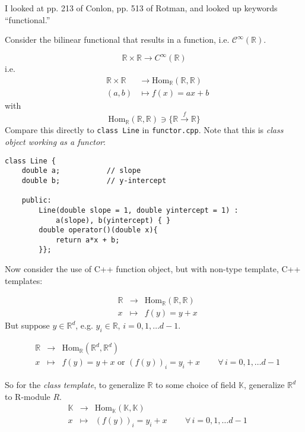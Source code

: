 \documentclass[10pt]{amsart}
\begin{document}
\begin{multicols*}{2}
I looked at pp. 213 of Conlon, pp. 513 of Rotman, and looked up keywords ``functional.''

Consider the bilinear functional that results in a function, i.e. $\mathcal{C}^{\infty}(\mathbb{R})$.

\[
\mathbb{R} \times \mathbb{R} \to C^{\infty}(\mathbb{R})
\]
i.e.
\begin{equation}
\begin{aligned}
  & \mathbb{R} \times \mathbb{R} & \to \text{Hom}_{\mathbb{R}}(\mathbb{R}, \mathbb{R})   \\
  & (a,b) & \mapsto f(x) = ax + b
\end{aligned}
\end{equation}
with
\[
\text{Hom}_{\mathbb{R}}(\mathbb{R}, \mathbb{R}) \ni \lbrace \mathbb{R} \xrightarrow{f} \mathbb{R} \rbrace
\]
Compare this directly to \verb|class Line| in \verb|functor.cpp|.  Note that this is \emph{class object working as a functor}:

\begin{lstlisting}
class Line {
	double a;			// slope
	double b; 			// y-intercept
	
	public:
		Line(double slope = 1, double yintercept = 1) : 
			a(slope), b(yintercept) { } 
		double operator()(double x){
			return a*x + b;
		}};
  \end{lstlisting}
Now consider the use of C++ function object, but with non-type template, C++ templates:

\begin{equation}
\begin{aligned}
  & \mathbb{R} & \to & \text{Hom}_{\mathbb{R}}( \mathbb{R}, \mathbb{R} ) \\ 
  & x & \mapsto & f(y) = y + x 
  \end{aligned}
  \end{equation}
But suppose $y\in \mathbb{R}^d$, e.g. $y_i \in \mathbb{R}$, $i=0,1,\dots d-1$.

\begin{equation}
\begin{aligned}
  & \mathbb{R} & \to & \text{Hom}_{\mathbb{R}}( \mathbb{R}^d, \mathbb{R}^d ) \\ 
  & x & \mapsto & f(y) = y + x  \text{ or } (f(y))_i = y_i + x \qquad \, \forall \, i = 0, 1, \dots d-1
  \end{aligned}
  \end{equation}

So for the \emph{class template}, to generalize $\mathbb{R}$ to some choice of field $\mathbb{K}$, generalize $\mathbb{R}^d$ to R-module $R$.
\begin{equation}
\begin{aligned}
  & \mathbb{K} & \to & \text{Hom}_{\mathbb{K}}( \mathbb{K}, \mathbb{K} ) \\ 
  & x & \mapsto & (f(y))_i = y_i + x \qquad \, \forall \, i = 0, 1, \dots d-1
  \end{aligned}
  \end{equation}


\end{multicols*}
\end{document}

